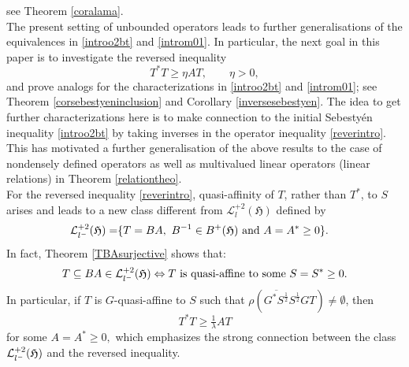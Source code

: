 \documentclass{amsart}
\newcommand{\ifaf}{\Leftrightarrow}
\newcommand{\vide}{\emptyset}
\newcommand{\h}{\mathfrak{H}}
\newcommand{\adj}{^*}
\newcommand{\inv}{^{-1}}
\newcommand{\tstar}{T^{*}}
\newcommand{\half}{^{\frac{1}{2}}}
\newcommand{\inclu}{\subseteq}
\newcommand{\lplus}{B^{+}(\h)}
\newcommand{\ldeux}{\mathcal{L}_l^{+2}(\h)}
\newcommand{\lldeux}{\mathcal{L}_{{l}^{\tiny-}}^{+2}(\h)}
\numberwithin{equation}{section}
\begin{document}
%
see Theorem \ref{coralama}.\\
\hspace*{0.4cm} The present setting of unbounded operators leads to further generalisations of the equivalences  in  \eqref{introo2bt} and \eqref{introm01}. In particular, the next goal in this paper is to investigate the reversed    inequality
                 \begin{equation} \label{reverintro}
                \tstar T \geq  \eta AT,  \qquad    \eta >0,
                \end{equation}
       and prove analogs for the characterizations in \eqref{introo2bt} and \eqref{introm01}; see   Theorem \ref{corsebestyeninclusion} and Corollary \ref{inversesebestyen}. The idea to get further characterizations here is to make connection to the initial Sebestyén inequality \eqref{introo2bt} by taking inverses in the operator inequality \eqref{reverintro}. This has motivated   a further  generalisation of the above results  to the case of nondensely defined operators as well as multivalued linear operators (linear relations) in    Theorem \ref{relationtheo}. \\
               \hspace*{0.4cm} For the reversed  inequality \eqref{reverintro},  quasi-affinity of $T$, rather than $\tstar$, to $S$ arises
               and leads to a new  class different from $\ldeux$ defined by
                       \begin{align*}
                            \lldeux=
                             &  \{ T= BA , \ B\inv \in \lplus \text{ and }   A = A\adj \geq 0 \}.
                 \end{align*}
                 In fact,
                 Theorem \ref{TBAsurjective} shows that:
                \begin{equation}\label{introm3}
                   T \inclu B A  \in \lldeux \ifaf T \text{ is  quasi-affine to some } S=S\adj \geq 0.
                \end{equation}
 In particular, if $T$ is $G$-quasi-affine to $S$  such that $\rho(\overline{ G\adj S\half } S\half G T) \neq \vide$,  then
       $$ T^* T  \geq  \tfrac{1}{\lambda}    AT  $$
       for some $A= A\adj \geq 0,$ which emphasizes the strong connection between  the class $\lldeux$ and the reversed  inequality.\\
 
\end{document}
